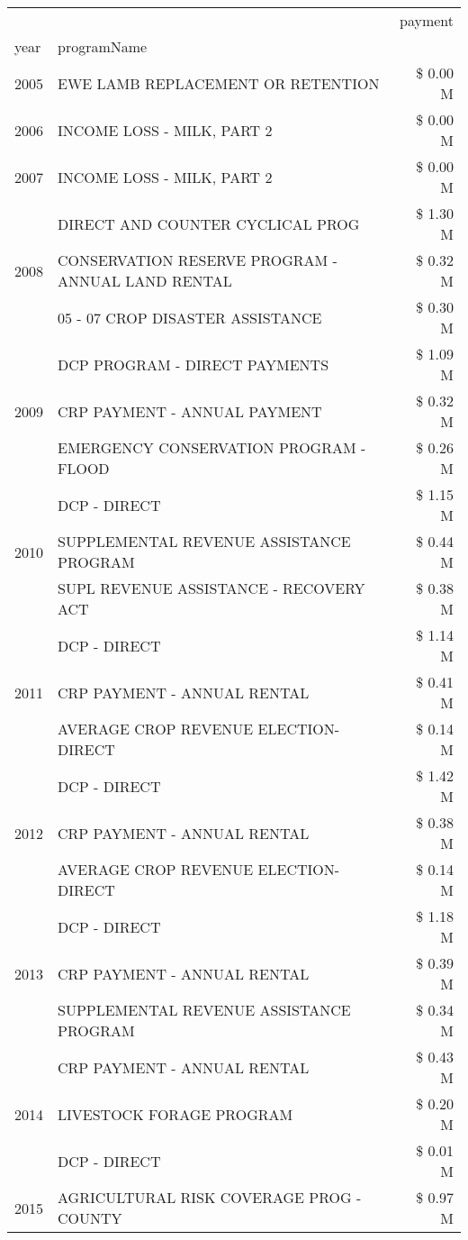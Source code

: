 \begin{tabular}{llr}
\toprule
 &  & payment \\
year & programName &  \\
\midrule
2005 & EWE LAMB REPLACEMENT OR RETENTION & \$ 0.00 M \\
\cline{1-3}
2006 & INCOME LOSS - MILK, PART 2 & \$ 0.00 M \\
\cline{1-3}
2007 & INCOME LOSS - MILK, PART 2 & \$ 0.00 M \\
\cline{1-3}
\multirow[t]{3}{*}{2008} & DIRECT AND COUNTER CYCLICAL PROG & \$ 1.30 M \\
 & CONSERVATION RESERVE PROGRAM - ANNUAL LAND RENTAL & \$ 0.32 M \\
 & 05 - 07 CROP DISASTER ASSISTANCE & \$ 0.30 M \\
\cline{1-3}
\multirow[t]{3}{*}{2009} & DCP PROGRAM - DIRECT PAYMENTS & \$ 1.09 M \\
 & CRP PAYMENT - ANNUAL PAYMENT & \$ 0.32 M \\
 & EMERGENCY CONSERVATION PROGRAM - FLOOD & \$ 0.26 M \\
\cline{1-3}
\multirow[t]{3}{*}{2010} & DCP - DIRECT & \$ 1.15 M \\
 & SUPPLEMENTAL REVENUE ASSISTANCE PROGRAM & \$ 0.44 M \\
 & SUPL REVENUE ASSISTANCE - RECOVERY ACT & \$ 0.38 M \\
\cline{1-3}
\multirow[t]{3}{*}{2011} & DCP - DIRECT & \$ 1.14 M \\
 & CRP PAYMENT - ANNUAL RENTAL & \$ 0.41 M \\
 & AVERAGE CROP REVENUE ELECTION-DIRECT & \$ 0.14 M \\
\cline{1-3}
\multirow[t]{3}{*}{2012} & DCP - DIRECT & \$ 1.42 M \\
 & CRP PAYMENT - ANNUAL RENTAL & \$ 0.38 M \\
 & AVERAGE CROP REVENUE ELECTION-DIRECT & \$ 0.14 M \\
\cline{1-3}
\multirow[t]{3}{*}{2013} & DCP - DIRECT & \$ 1.18 M \\
 & CRP PAYMENT - ANNUAL RENTAL & \$ 0.39 M \\
 & SUPPLEMENTAL REVENUE ASSISTANCE PROGRAM & \$ 0.34 M \\
\cline{1-3}
\multirow[t]{3}{*}{2014} & CRP PAYMENT - ANNUAL RENTAL & \$ 0.43 M \\
 & LIVESTOCK FORAGE PROGRAM & \$ 0.20 M \\
 & DCP - DIRECT & \$ 0.01 M \\
\cline{1-3}
\multirow[t]{3}{*}{2015} & AGRICULTURAL RISK COVERAGE PROG - COUNTY & \$ 0.97 M \\

\end{tabular}
